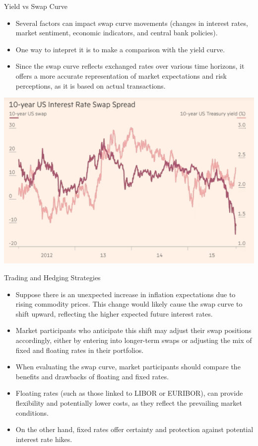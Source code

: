 \documentclass{beamer}
\begin{document}
\begin{frame}{Yield vs Swap Curve} 
\begin{itemize}
\item Several factors can impact swap curve movements (changes in interest rates, market sentiment, economic indicators, and central bank policies).
\item One way to intepret it is to make a comparison with the yield curve.
\item Since the swap curve reflects exchanged rates over various time horizons, it offers a more accurate representation of market expectations and risk perceptions, as it is based on actual transactions.
\end{itemize}
\begin{center}
	\includegraphics[width=0.4\linewidth]{swap_spread}
\end{center}
\end{frame}

\begin{frame}{Trading and Hedging Strategies}
\begin{itemize}
\item Suppose there is an unexpected increase in inflation expectations due to rising commodity prices. This change would likely cause the swap curve to shift upward, reflecting the higher expected future interest rates. 
\item Market participants who anticipate this shift may adjust their swap positions accordingly, either by entering into longer-term swaps or adjusting the mix of fixed and floating rates in their portfolios.
\item When evaluating the swap curve, market participants should compare the benefits and drawbacks of floating and fixed rates. 
\item Floating rates (such as those linked to LIBOR or EURIBOR), can provide flexibility and potentially lower costs, as they reflect the prevailing market conditions. 
\item On the other hand, fixed rates offer certainty and protection against potential interest rate hikes. 
\end{itemize}
\end{frame}
\end{document}
